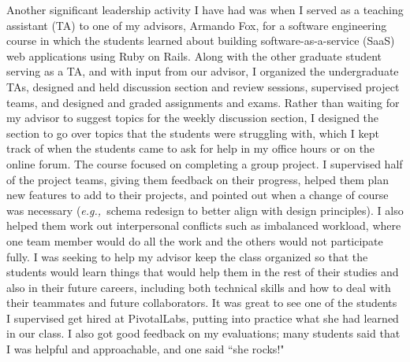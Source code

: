 \documentclass{article}
\newcommand{\eg}{{\em e.g.,}~}
\begin{document}
Another significant leadership activity I have had was when I served as a teaching assistant (TA) to one of my advisors, Armando Fox, for a software engineering course in which the students learned about building software-as-a-service (SaaS) web applications using Ruby on Rails.
Along with the other graduate student serving as a TA, and with input from our advisor, I organized the undergraduate TAs, designed and held discussion section and review sessions, supervised project teams, and designed and graded assignments and exams.
Rather than waiting for my advisor to suggest topics for the weekly discussion section, I designed the section to go over topics that the students were struggling with, which I kept track of when the students came to ask for help in my office hours or on the online forum.
The course focused on completing a group project.
I supervised half of the project teams, giving them feedback on their progress, helped them plan new features to add to their projects, and pointed out when a change of course was necessary (\eg schema redesign to better align with design principles).
I also helped them work out interpersonal conflicts such as imbalanced workload, where one team member would do all the work and the others would not participate fully.
I was seeking to help my advisor keep the class organized so that the students would learn things that would help them in the rest of their studies and also in their future careers, including both technical skills and how to deal with their teammates and future collaborators.
It was great to see one of the students I supervised get hired at PivotalLabs, putting into practice what she had learned in our class.
I also got good feedback on my evaluations; many students said that I was helpful and approachable, and one said ``she rocks!"
\end{document}
